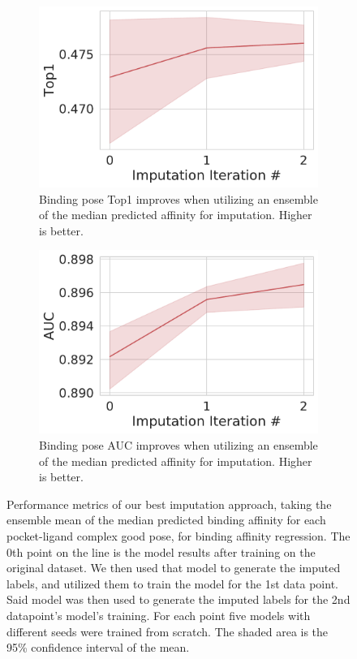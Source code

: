 \documentclass[journal=jmcmar,manuscript=article]{achemso}
\begin{document}
\begin{figure}[tbph]
    \begin{subfigure}[t]{0.48\textwidth}
        \centering
        \includegraphics[width=\linewidth]{figures/MedGOEnsTop1.pdf}
        \caption{Binding pose Top1 improves when utilizing an ensemble of the median predicted affinity for imputation. Higher is better.}
    \end{subfigure}
    \hfill
    \begin{subfigure}[t]{0.48\textwidth}
        \centering
        \includegraphics[width=\linewidth]{figures/MedGOEnsAUC.pdf}
        \caption{Binding pose AUC improves when utilizing an ensemble of the median predicted affinity for imputation. Higher is better.}
    \end{subfigure}
    \caption{Performance metrics of our best imputation approach, taking the ensemble mean of the median predicted binding affinity for each pocket-ligand complex good pose, for binding affinity regression. The 0th point on the line is the model results after training on the original dataset. We then used that model to generate the imputed labels, and utilized them to train the model for the 1st data point. Said model was then used to generate the imputed labels for the 2nd datapoint's model's training. For each point five models with different seeds were trained from scratch. The shaded area is the 95\% confidence interval of the mean.}
    \label{fig:medGOEnsOverall}
\end{figure}
\end{document}
